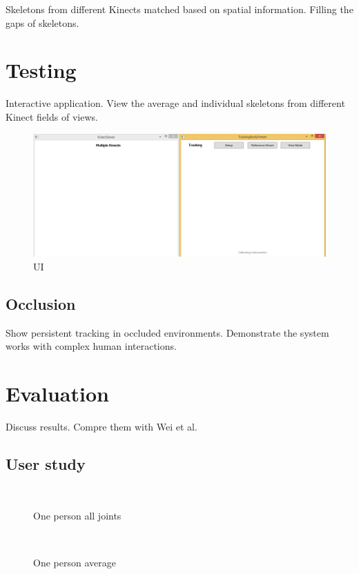 \documentclass{sigchi}
\begin{document}
Skeletons from different Kinects matched based on spatial information. Filling the gaps of skeletons.

\section{Testing}

Interactive application. View the average and individual skeletons from different Kinect fields of views.

\begin{figure}
  \centering
  \includegraphics[width=0.9\columnwidth]{ui}
  \caption{UI}
  \label{fig:ui}
\end{figure}

\subsection{Occlusion}

Show persistent tracking in occluded environments. Demonstrate the system works with complex human interactions.
 
\section{Evaluation}

Discuss results. Compre them with Wei et al.

\subsection{User study}

\begin{figure}
  \centering
  
  \caption{One person all joints}~\label{fig:one_person_all}
\end{figure}

\begin{figure}
  \centering
  
  \caption{One person average}~\label{fig:one_person_average}
\end{figure}
\end{document}
